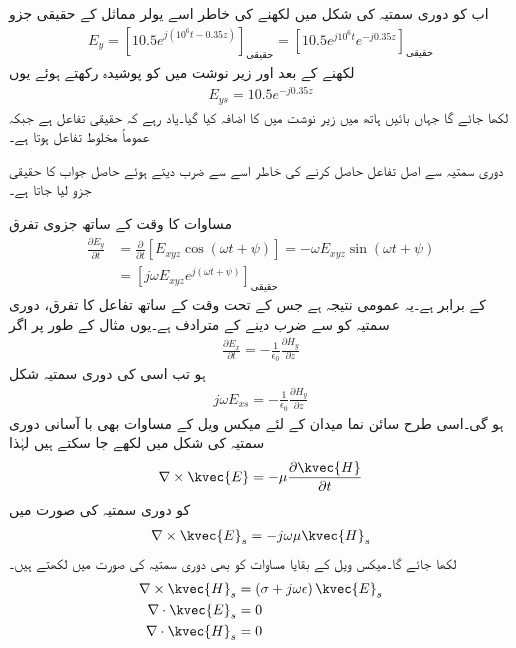 اب  کو دوری سمتیہ کی شکل میں لکھنے کی خاطر اسے یولر مماثل کے حقیقی جزو
\begin{align*}
E_y=\left[10.5 e^{j(10^6 t -0.35z)} \right]_{\textrm{حقیقی}}=\left[10.5 e^{j10^6 t} e^{ -j0.35z} \right]_{\textrm{حقیقی}}
\end{align*}
لکھنے کے بعد  اور زیر نوشت میں  کو پوشیدہ رکھتے ہوئے یوں
\begin{align*}
E_{ys}=10.5 e^{-j 0.35z}
\end{align*} 
لکھا جائے گا جہاں بائیں ہاتھ  میں زیر نوشت میں  کا اضافہ کیا گیا۔یاد رہے کہ  حقیقی تفاعل ہے جبکہ  عموماً مخلوط تفاعل ہوتا ہے۔

دوری سمتیہ سے اصل تفاعل حاصل کرنے کی خاطر اسے  سے ضرب دیتے ہوئے حاصل جواب کا حقیقی جزو لیا جاتا ہے۔

مساوات  کا وقت کے ساتھ جزوی تفرق
\begin{align*}
\frac{\partial E_y}{\partial t}&=\frac{\partial }{\partial t} [E_{xyz} \cos(\omega t +\psi)]=-\omega E_{xyz} \sin (\omega t +\psi)\\
&=\left[j \omega  E_{xyz} e^{j(\omega t +\psi)} \right]_{\textrm{حقیقی}}
\end{align*} 
کے برابر ہے۔یہ عمومی نتیجہ ہے جس کے تحت وقت کے ساتھ تفاعل کا تفرق، دوری سمتیہ کو  سے ضرب دینے کے مترادف ہے۔یوں مثال کے طور پر اگر
\begin{align*}
\frac{\partial E_x}{\partial t}=-\frac{1}{\epsilon_0} \frac{\partial H_y}{\partial z}
\end{align*}
ہو تب اسی کی دوری سمتیہ شکل
\begin{align*}
j \omega E_{xs}=-\frac{1}{\epsilon_0} \frac{\partial H_y}{\partial z}
\end{align*}
ہو گی۔اسی طرح سائن نما میدان کے لئے میکس ویل کے مساوات بھی با آسانی دوری سمتیہ کی شکل میں لکھے جا سکتے ہیں لہٰذا
\begin{align*}
\nabla \times \kvec{E}=-\mu\frac{\partial \kvec{H}}{\partial t}
\end{align*} 
کو دوری سمتیہ کی صورت میں
\begin{align}   \label{مساوات_موج_میکس_ویل_دوری_سمتیہ_شکل_الف}
\nabla \times \kvec{E}_s=-j \omega \mu \kvec{H}_s
\end{align}
لکھا جائے گا۔میکس ویل کے بقایا مساوات کو بھی دوری سمتیہ کی صورت میں لکھتے ہیں۔
\begin{align}
\nabla \times \kvec{H}_s &=\left(\sigma +j \omega \epsilon \right) \kvec{E}_s   \label{مساوات_موج_میکس_ویل_دوری_سمتیہ_شکل_ب}\\
\nabla \cdot \kvec{E}_s &=0   \label{مساوات_موج_میکس_ویل_دوری_سمتیہ_شکل_پ}\\
\nabla \cdot \kvec{H}_s&=0   \label{مساوات_موج_میکس_ویل_دوری_سمتیہ_شکل_ت}
\end{align}

